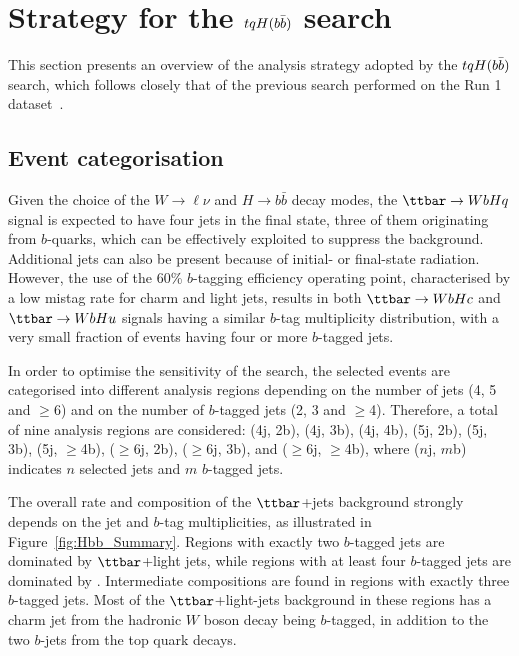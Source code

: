 
\section{Strategy for the $tqH(b\bar{b})$ search}
\label{sec:strategy_Hbb}

This section presents an overview of the analysis strategy adopted by the $tqH(b\bar{b})$ search, which
follows closely that of the previous search performed on the Run 1 dataset~\cite{Aad:2015pja}.

\subsection{Event categorisation}
\label{sec:event_categorisation}

Given the choice of the $W\to\ell\nu$ and $H\to b\bar{b}$ decay modes, the $\ttbar \to WbHq$ signal 
is expected to have four jets in the final state, three of them originating from $b$-quarks, which 
can be effectively exploited to suppress the background. 
Additional jets can also be present because of initial- or final-state radiation.
However, the use of the 60\% $b$-tagging efficiency operating point, characterised by a low mistag rate for
charm and light jets, results in both $\Hc$ and $\Hu$ signals having a similar $b$-tag multiplicity distribution,
with a very small fraction of events having four or more $b$-tagged jets.

In order to optimise the sensitivity of the search, the selected events are categorised into different analysis 
regions depending on the number of jets (4, 5 and $\geq$6) and on the number of $b$-tagged jets (2, 3 and $\geq$4).
Therefore, a total of nine analysis regions are considered:
(4j, 2b), (4j, 3b), (4j, 4b), (5j, 2b), (5j, 3b), (5j, $\geq$4b), ($\geq$6j, 2b), ($\geq$6j, 3b), and ($\geq$6j, $\geq$4b), 
where ($n$j, $m$b) indicates $n$ selected jets and $m$ $b$-tagged jets. 

The overall rate and composition of the $\ttbar$+jets background strongly depends on the jet and $b$-tag 
multiplicities, as illustrated in Figure~\ref{fig:Hbb_Summary}.
Regions with exactly two $b$-tagged jets are dominated by $\ttbar$+light jets, while regions with 
at least four $b$-tagged jets are dominated by \ttbin. Intermediate compositions are found in regions with exactly three 
$b$-tagged jets.  Most of the $\ttbar$+light-jets background in these regions has a charm jet from the hadronic $W$ boson 
decay  being $b$-tagged, in addition to the two $b$-jets from the top quark decays.

